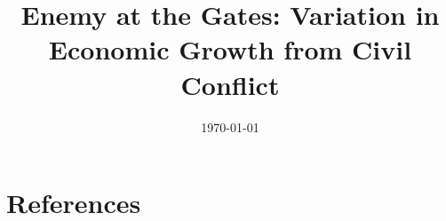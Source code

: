 \documentclass[12pt,onesided]{amsart}
\title[Enemy at the Gates]{Enemy at the Gates: Variation in Economic Growth from Civil Conflict}
\date{\today}
\begin{document}

% 

\newpage
\newpage\setcounter{page}{1} 











\newpage

\section*{References}
%  


\end{document}
